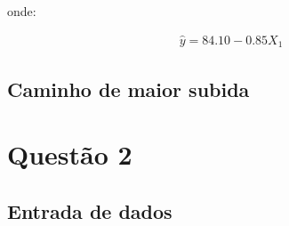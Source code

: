 \documentclass[
]{article}
\begin{document}
onde:

\begin{align}
\hat{y} = 84.10 - 0.85X_1
\end{align}

\hypertarget{caminho-de-maior-subida}{%
\subsection{Caminho de maior subida}\label{caminho-de-maior-subida}}

\hypertarget{questuxe3o-2}{%
\section{Questão 2}\label{questuxe3o-2}}

\hypertarget{entrada-de-dados-1}{%
\subsection{Entrada de dados}\label{entrada-de-dados-1}}
\end{document}
